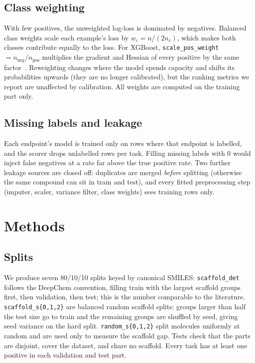 \documentclass[conference]{IEEEtran}
\begin{document}
\subsection{Class weighting}
With few positives, the unweighted log-loss is dominated by negatives. Balanced class weights scale each example's loss by $w_c = n / (2 n_c)$, which makes both classes contribute equally to the loss. For XGBoost, \texttt{scale\_pos\_weight} $= n_\text{neg}/n_\text{pos}$ multiplies the gradient and Hessian of every positive by the same factor~\cite{chen2016xgboost}. Reweighting changes where the model spends capacity and shifts its probabilities upwards (they are no longer calibrated), but the ranking metrics we report are unaffected by calibration. All weights are computed on the training part only.

\subsection{Missing labels and leakage}
Each endpoint's model is trained only on rows where that endpoint is labelled, and the scorer drops unlabelled rows per task. Filling missing labels with 0 would inject false negatives at a rate far above the true positive rate. Two further leakage sources are closed off: duplicates are merged \emph{before} splitting (otherwise the same compound can sit in train and test), and every fitted preprocessing step (imputer, scaler, variance filter, class weights) sees training rows only.

\section{Methods}
\subsection{Splits}
We produce seven 80/10/10 splits keyed by canonical SMILES:
\texttt{scaffold\_det} follows the DeepChem convention, filling train with the largest scaffold groups first, then validation, then test; this is the number comparable to the literature. \texttt{scaffold\_s\{0,1,2\}} are balanced random scaffold splits: groups larger than half the test size go to train and the remaining groups are shuffled by seed, giving seed variance on the hard split. \texttt{random\_s\{0,1,2\}} split molecules uniformly at random and are used only to measure the scaffold gap. Tests check that the parts are disjoint, cover the dataset, and share no scaffold. Every task has at least one positive in each validation and test part.
\end{document}

